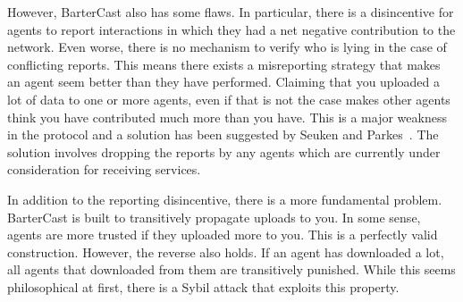 \documentclass[a4paper,11pt]{book}
\theoremstyle{definition}
\begin{document}
However, BarterCast also has some flaws. In particular, there is a disincentive for agents to report
interactions in which they had a net negative contribution to the network. Even worse, there is no mechanism
to verify who is lying in the case of conflicting reports. This means there exists a
misreporting strategy that makes an agent seem better than they have performed.
Claiming that you uploaded a lot of data to one or more agents, even if that is not
the case makes other agents think you have contributed much more than you have.
This is a major weakness in the protocol and a solution has been suggested by Seuken and 
Parkes~\cite{seuken2010accounting}. The solution involves dropping the reports by any agents
which are currently under consideration for receiving services.

In addition to the reporting disincentive, there is a more fundamental problem. BarterCast is built
to transitively propagate uploads to you. In some sense, agents are more trusted if they uploaded
more to you. This is a perfectly valid construction. However, the reverse also holds. If an agent
has downloaded a lot, all agents that downloaded from them are transitively punished. While
this seems philosophical at first, there is a Sybil
attack that exploits this property.
\end{document}
